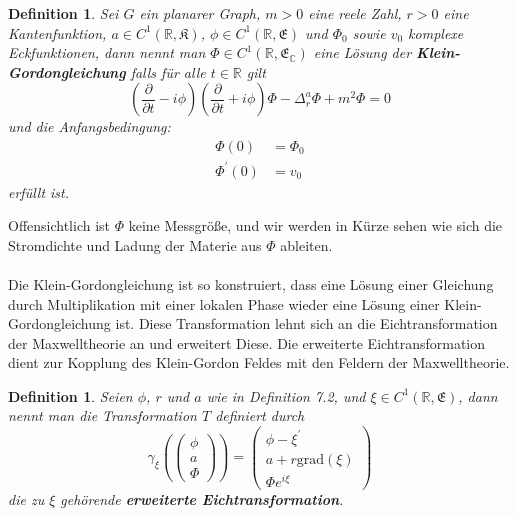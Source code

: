 \documentclass[11pt,a4paper,leqno]{report}
\newtheorem{definition}[theorem]{Definition}
\numberwithin{equation}{chapter}
\begin{document}
\begin{definition}
	Sei $G$ ein planarer Graph, $m>0$ eine reele Zahl, $r>0$ eine Kantenfunktion, $a\in C^1(\mathbb{R}, \mathfrak{K})$, $\phi\in C^1(\mathbb{R}, \mathfrak{E})$ und $\Phi_0$ sowie $v_0$ komplexe Eckfunktionen, dann nennt man $\Phi\in C^1(\mathbb{R}, \mathfrak{E}_\mathbb{C})$ eine L\"osung der \textbf{Klein-Gordongleichung} falls f\"ur alle $t\in\mathbb{R}$ gilt
	\begin{equation}
		(\frac{\partial}{\partial t} - i\phi)(\frac{\partial}{\partial t} + i\phi)\Phi - \Delta_r^a\Phi+ m^2 \Phi = 0
	\end{equation}
	und die Anfangsbedingung:
	\begin{align}
		\Phi(0)&=\Phi_0\\
		\Phi^\prime(0)&=v_0
	\end{align}
	erf\"ullt ist.
\end{definition}
\noindent
Offensichtlich ist $\Phi$ keine Messgr\"o\ss{}e, und wir werden in K\"urze sehen wie sich die Stromdichte und Ladung der Materie aus $\Phi$ ableiten.\\ 
\\
Die Klein-Gordongleichung ist so konstruiert, dass eine L\"osung einer Gleichung durch Multiplikation mit einer lokalen Phase wieder eine L\"osung einer Klein-Gordongleichung ist. Diese Transformation lehnt sich an die Eichtransformation der Maxwelltheorie an und erweitert Diese. Die erweiterte Eichtransformation dient zur Kopplung des Klein-Gordon Feldes mit den Feldern der Maxwelltheorie. 
\begin{definition}
	Seien $\phi$, $r$ und $a$ wie in Definition 7.2, und $\xi\in C^1(\mathbb{R}, \mathfrak{E})$, dann nennt man die Transformation $T$ definiert durch
	\begin{equation}
		\gamma_\xi(\left(
		\begin{array}{c}\phi\\
			a\\
			\Phi
		\end{array}\right))=
		\left(
		\begin{array}{c}\phi - \xi^\prime\\
			a + r\text{grad}(\xi) \\
			\Phi e^{i\xi}
		\end{array}\right)
	\end{equation} 
	die zu $\xi$ geh\"orende \textbf{erweiterte Eichtransformation}.
\end{definition}
\noindent
\end{document}
